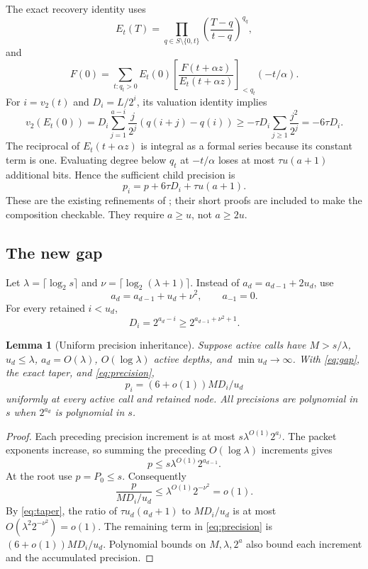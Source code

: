 \documentclass[11pt]{article}
\newtheorem{lemma}[theorem]{Lemma}
\theoremstyle{remark}\newtheorem{remark}[theorem]{Remark}
\newcommand{\vTwo}{v_2}
\newcommand{\lp}{\log_2}
\begin{document}
The exact recovery identity uses
\[
 E_t(T)=\prod_{q\in S\setminus\{0,t\}}
           \left(\frac{T-q}{t-q}\right)^{q_q},
\]
and
\begin{equation}
 F(0)=\sum_{t:q_t>0} E_t(0)
  \left[\frac{F(t+\alpha z)}{E_t(t+\alpha z)}\right]_{<q_t}
                 (-t/\alpha).
 \label{eq:recover}
\end{equation}
For $i=\vTwo(t)$ and $D_i=L/2^i$, its valuation identity implies
\[
 \vTwo(E_t(0))
 =D_i\sum_{j=1}^{a-i}\frac j{2^j}(q(i+j)-q(i))
 \ge-\tau D_i\sum_{j\ge1}\frac{j^2}{2^j}=-6\tau D_i.
\]
The reciprocal of $E_t(t+\alpha z)$ is integral as a formal series because its constant term is one. Evaluating degree below $q_t$ at $-t/\alpha$ loses at most $\tau u(a+1)$ additional bits. Hence the sufficient child precision is
\begin{equation}
 p_i=p+6\tau D_i+\tau u(a+1).
 \label{eq:precision}
\end{equation}
These are the existing refinements of \cite{contraction-packet,precision}; their short proofs are included to make the composition checkable. They require $a\ge u$, not $a\ge2u$.

\subsection{The new gap}
Let $\lambda=\lceil\lp s\rceil$ and $\nu=\lceil\lp(\lambda+1)\rceil$. Instead of $a_d=a_{d-1}+2u_d$, use
\begin{equation}
 a_d=a_{d-1}+u_d+\nu^2,\qquad a_{-1}=0.
 \label{eq:gap}
\end{equation}
For every retained $i<u_d$,
\begin{equation}
 D_i=2^{a_d-i}\ge2^{a_{d-1}+\nu^2+1}.
 \label{eq:Dgap}
\end{equation}

\begin{lemma}[Uniform precision inheritance]
\label{lem:inheritance}
Suppose active calls have $M>s/\lambda$, $u_d\le\lambda$, $a_d=O(\lambda)$, $O(\log\lambda)$ active depths, and $\min u_d\to\infty$. With \eqref{eq:gap}, the exact taper, and \eqref{eq:precision},
\begin{equation}
 p_i=(6+o(1))MD_i/u_d
 \label{eq:precision-asymptotic}
\end{equation}
uniformly at every active call and retained node. All precisions are polynomial in $s$ when $2^{a_d}$ is polynomial in $s$.
\end{lemma}

\begin{proof}
Each preceding precision increment is at most $s\lambda^{O(1)}2^{a_j}$. The packet exponents increase, so summing the preceding $O(\log\lambda)$ increments gives
\[
 p\le s\lambda^{O(1)}2^{a_{d-1}}.
\]
At the root use $p=P_0\le s$. Consequently
\[
 \frac{p}{MD_i/u_d}\le\lambda^{O(1)}2^{-\nu^2}=o(1).
\]
By \eqref{eq:taper}, the ratio of $\tau u_d(a_d+1)$ to $MD_i/u_d$ is at most $O(\lambda^2 2^{-\nu^2})=o(1)$. The remaining term in \eqref{eq:precision} is $(6+o(1))MD_i/u_d$. Polynomial bounds on $M,\lambda,2^a$ also bound each increment and the accumulated precision.
\end{proof}
\end{document}
